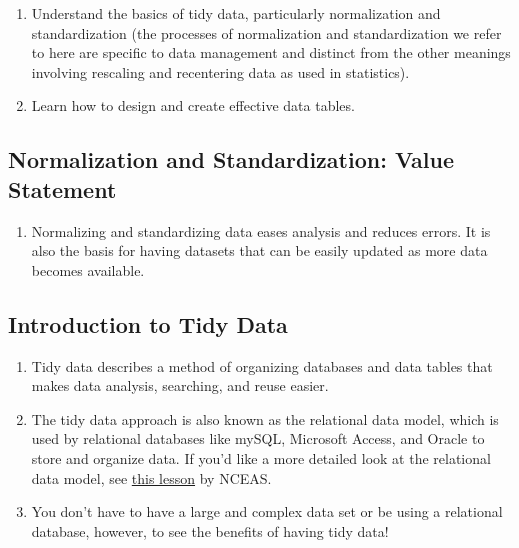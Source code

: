 \documentclass[
]{book}
\providecommand{\tightlist}{%
  \setlength{\itemsep}{0pt}\setlength{\parskip}{0pt}}
\begin{document}
\begin{enumerate}
\def\labelenumi{\arabic{enumi}.}
\item
  Understand the basics of tidy data, particularly normalization and standardization (the processes of normalization and standardization we refer to here are specific to data management and distinct from the other meanings involving rescaling and recentering data as used in statistics).
\item
  Learn how to design and create effective data tables.
\end{enumerate}

\hypertarget{normalization-and-standardization-value-statement}{%
\subsection{Normalization and Standardization: Value Statement}\label{normalization-and-standardization-value-statement}}

\begin{enumerate}
\def\labelenumi{\arabic{enumi}.}
\tightlist
\item
  Normalizing and standardizing data eases analysis and reduces errors. It is also the basis for having datasets that can be easily updated as more data becomes available.
\end{enumerate}

\hypertarget{introduction-to-tidy-data}{%
\subsection{Introduction to Tidy Data}\label{introduction-to-tidy-data}}

\begin{enumerate}
\def\labelenumi{\arabic{enumi}.}
\item
  Tidy data describes a method of organizing databases and data tables that makes data analysis, searching, and reuse easier.
\item
  The tidy data approach is also known as the relational data model, which is used by relational databases like mySQL, Microsoft Access, and Oracle to store and organize data. If you'd like a more detailed look at the relational data model, see \href{https://learning.nceas.ucsb.edu/2020-11-RRCourse/session-7-data-modeling-essentials.html\#data-modeling-tidy-data}{this lesson} by NCEAS.
\item
  You don't have to have a large and complex data set or be using a relational database, however, to see the benefits of having tidy data!
\end{enumerate}
\end{document}
